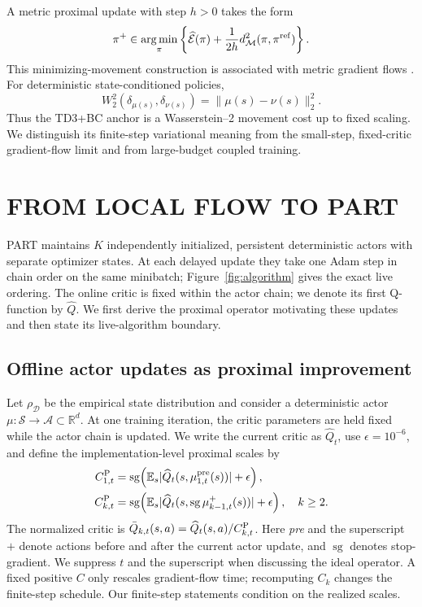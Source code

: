 \documentclass[twoside]{article}
\newcommand{\sg}{\operatorname{sg}}
\DeclareMathOperator*{\argmin}{arg\,min}
\begin{document}
A metric proximal update with step $h>0$ takes the form
\begin{equation}
\pi^+\in\argmin_\pi\left\{\widehat{\mathcal E}(\pi)
+\frac{1}{2h}d_{\mathcal M}^2(\pi,\pi^{\rm ref})\right\}.
\label{eq:generic_prox}
\end{equation}
This minimizing-movement construction is associated with metric gradient
flows \citep{ambrosio2005gradient,otto2001geometry}. For deterministic
state-conditioned policies,
\begin{equation}
W_2^2(\delta_{\mu(s)},\delta_{\nu(s)})=\|\mu(s)-\nu(s)\|_2^2.
\label{eq:dirac_w2_background}
\end{equation}
Thus the TD3+BC anchor is a Wasserstein--2 movement cost up to fixed scaling.
We distinguish its finite-step variational meaning from the small-step,
fixed-critic gradient-flow limit and from large-budget coupled training.

\section{FROM LOCAL FLOW TO PART}
\label{sec:method}

PART maintains $K$ independently initialized, persistent deterministic
actors with separate optimizer states. At each delayed update they take one
Adam step in chain order on the same minibatch; Figure~\ref{fig:algorithm} gives
the exact live ordering. The online critic is fixed within the actor chain; we
denote its first Q-function by $\widehat Q$. We first derive the proximal
operator motivating these updates and then state its live-algorithm boundary.
\subsection{Offline actor updates as proximal improvement}

Let $\rho_{\mathcal D}$ be the empirical state distribution and consider a
deterministic actor $\mu:\mathcal S\rightarrow\mathcal A\subset\mathbb R^d$.
At one training iteration, the critic parameters are held fixed while the actor
chain is updated. We write the current critic as $\widehat Q_t$, use
$\epsilon=10^{-6}$, and define the implementation-level proximal scales by
\begin{equation}
\begin{aligned}
 C_{1,t}^{\rm P}
 &=\sg\!\left(\mathbb E_s
 |\widehat Q_t(s,\mu_{1,t}^{\rm pre}(s))|+\epsilon\right),\\
 C_{k,t}^{\rm P}
 &=\sg\!\left(\mathbb E_s
 |\widehat Q_t(s,\sg\mu_{k-1,t}^{+}(s))|+\epsilon\right),\quad k\ge2.
\end{aligned}
\label{eq:qnorm}
\end{equation}
The normalized critic is
$\bar Q_{k,t}(s,a)=\widehat Q_t(s,a)/C_{k,t}^{\rm P}$.
Here \emph{pre} and the superscript $+$ denote actions before and after the
current actor update, and $\sg$ denotes stop-gradient. We suppress $t$ and the
superscript when discussing the ideal operator. A fixed positive $C$ only
rescales gradient-flow time; recomputing $C_k$ changes the finite-step schedule.
Our finite-step statements condition on the realized scales.
\end{document}
